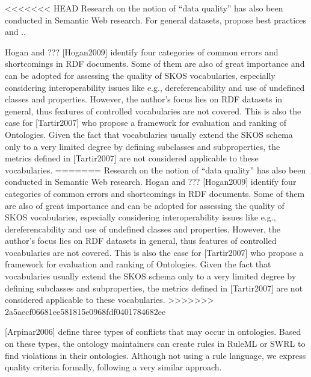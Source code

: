 <<<<<<< HEAD
Research on the notion of “data quality” has also been conducted in Semantic Web research. For general datasets, \cite{Heath2011,Hogan2010} propose best practices and ..   \cite{Tartir2007} 

Hogan and ??? [Hogan2009] identify four categories of common errors and shortcomings in RDF documents. Some of them are also of great importance and can be adopted for assessing the quality of SKOS vocabularies, especially considering interoperability issues like e.g., dereferencability and use of undefined classes and properties. However, the author’s focus lies on RDF datasets in general, thus features of controlled vocabularies are not covered. This is also the case for [Tartir2007] who propose a framework for evaluation and ranking of Ontologies. Given the fact that vocabularies usually extend the SKOS schema only to a very limited degree by defining subclasses and subproperties, the metrics defined in [Tartir2007] are not considered applicable to these vocabularies.
=======
Research on the notion of “data quality” has also been conducted in Semantic Web research. Hogan and ??? [Hogan2009] identify four categories of common errors and shortcomings in RDF documents. Some of them are also of great importance and can be adopted for assessing the quality of SKOS vocabularies, especially considering interoperability issues like e.g., dereferencability and use of undefined classes and properties. However, the author’s focus lies on RDF datasets in general, thus features of controlled vocabularies are not covered. This is also the case for [Tartir2007] who propose a framework for evaluation and ranking of Ontologies. Given the fact that vocabularies usually extend the SKOS schema only to a very limited degree by defining subclasses and subproperties, the metrics defined in [Tartir2007] are not considered applicable to these vocabularies.
>>>>>>> 2a5aecf06681ee581815e0968fdf0401784682ee

[Arpinar2006] define three types of conflicts that may occur in ontologies. Based on these types, the ontology maintainers can create rules in RuleML or SWRL to find violations in their ontologies. Although not using a rule language, we express quality criteria formally, following a very similar approach.

